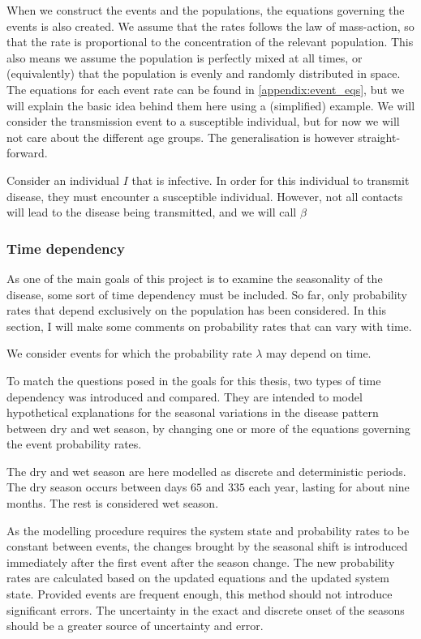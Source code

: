 \documentclass[10pt,a4paper]{article}
\begin{document}
When we construct the events and the populations, the equations governing the events is also created. We assume that the rates follows the law of mass-action, so that the rate is proportional to the concentration of the relevant population. This also means we assume the population is perfectly mixed at all times, or (equivalently) that the population is evenly and randomly distributed in space. The equations for each event rate can be found in \cref{appendix:event_eqs}, but we will explain the basic idea behind them here using a (simplified) example. We will consider the transmission event to a susceptible individual, but for now we will not care about the different age groups. The generalisation is however straight-forward.

Consider an individual $I$ that is infective. In order for this individual to transmit disease, they must encounter a susceptible individual. However, not all contacts will lead to the disease being transmitted, and we will call $\beta$ 

\subsubsection{Time dependency}


As one of the main goals of this project is to examine the seasonality of the disease, some sort of time dependency must be included. So far, only probability rates that depend exclusively on the population has been considered. In this section, I will make some comments on probability rates that can vary with time.

We consider events for which the probability rate $\lambda$ may depend on time. 

To match the questions posed in the goals for this thesis, two types of time dependency was introduced and compared. They are intended to model hypothetical explanations for the seasonal variations in the disease pattern between dry and wet season, by changing one or more of the equations governing the event probability rates.

The dry and wet season are here modelled as discrete and deterministic periods. The dry season occurs between days $65$ and $335$ each year, lasting for about nine months. The rest is considered wet season.

As the modelling procedure requires the system state and probability rates to be constant between events, the changes brought by the seasonal shift is introduced immediately after the first event after the season change. The new probability rates are calculated based on the updated equations and the updated system state. Provided events are frequent enough, this method should not introduce significant errors. The uncertainty in the exact and discrete onset of the seasons should be a greater source of uncertainty and error.
\end{document}
